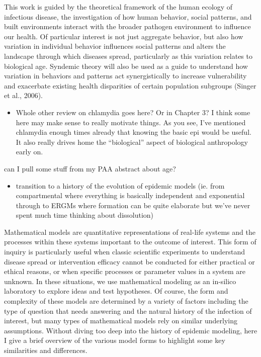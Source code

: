 \documentclass [11pt, proquest] {uwthesis}[2015/03/03]
\providecommand{\tightlist}{%
  \setlength{\itemsep}{0pt}\setlength{\parskip}{0pt}}
\begin{document}
This work is guided by the theoretical framework of the human ecology of
infectious disease, the investigation of how human behavior, social
patterns, and built environments interact with the broader pathogen
environment to influence our health. Of particular interest is not just
aggregate behavior, but also how variation in individual behavior
influences social patterns and alters the landscape through which
diseases spread, particularly as this variation relates to biological
age. Syndemic theory will also be used as a guide to understand how
variation in behaviors and patterns act synergistically to increase
vulnerability and exacerbate existing health disparities of certain
population subgroups (Singer et al., 2006).
\begin{itemize}
\tightlist
\item
  Whole other review on chlamydia goes here? Or in Chapter 3? I think
  some here may make sense to really motivate things. As you see, I've
  mentioned chlamydia enough times already that knowing the basic epi
  would be useful. It also really drives home the ``biological'' aspect
  of biological anthropology early on.
\end{itemize}
can I pull some stuff from my PAA abstract about age?
\begin{itemize}
\tightlist
\item
  transition to a history of the evolution of epidemic models (ie. from
  compartmental where everything is basically independent and
  exponential through to ERGMs where formation can be quite elaborate
  but we've never spent much time thinking about dissolution)
\end{itemize}
Mathematical models are quantitative representations of real-life
systems and the processes within these systems important to the outcome
of interest. This form of inquiry is particularly useful when classic
scientific experiments to understand disease spread or intervention
efficacy cannot be conducted for either practical or ethical reasons, or
when specific processes or parameter values in a system are unknown. In
these situations, we use mathematical modeling as an in-silico
laboratory to explore ideas and test hypotheses. Of course, the form and
complexity of these models are determined by a variety of factors
including the type of question that needs answering and the natural
history of the infection of interest, but many types of mathematical
models rely on similar underlying assumptions. Without diving too deep
into the history of epidemic modeling, here I give a brief overview of
the various model forms to highlight some key similarities and
differences.
\end{document}
